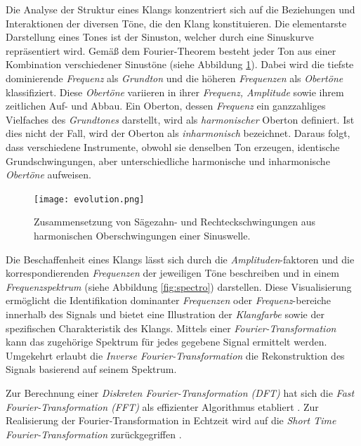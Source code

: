 \documentclass[
  a4paper,  %
  twoside,  %
  bibliography=totoc,
  headsepline,
  cleardoublepage=empty,
  parskip=half,
  draft=false
]{scrbook}
\begin{document}
Die Analyse der Struktur eines Klangs konzentriert sich auf die Beziehungen und Interaktionen der diversen Töne, die den Klang konstituieren. Die elementarste Darstellung eines Tones ist der Sinuston, welcher durch eine Sinuskurve repräsentiert wird. Gemäß dem Fourier-Theorem besteht jeder Ton aus einer Kombination verschiedener Sinustöne (siehe Abbildung \ref{fig:evolution}). Dabei wird die tiefste dominierende \emph{Frequenz} als \emph{Grundton} und die höheren \emph{Frequenzen} als \emph{Obertöne} klassifiziert. Diese \emph{Obertöne} variieren in ihrer \emph{Frequenz, Amplitude} sowie ihrem zeitlichen Auf- und Abbau. Ein Oberton, dessen \emph{Frequenz} ein ganzzahliges Vielfaches des \emph{Grundtones} darstellt, wird als \emph{harmonischer} Oberton definiert. Ist dies nicht der Fall, wird der Oberton als \emph{inharmonisch} bezeichnet. Daraus folgt, dass verschiedene Instrumente, obwohl sie denselben Ton erzeugen, identische Grundschwingungen, aber unterschiedliche harmonische und inharmonische \emph{Obertöne} aufweisen. \cite{parker_good_2009, white_physics_2014, ruschkowski_elektronische_2019}

\begin{figure}
  \centering
  \texttt{[image: evolution.png]}
  \caption[Fourier Reihe]{Zusammensetzung von Sägezahn- und Rechteckschwingungen aus harmonischen Oberschwingungen einer Sinuswelle.}
  \label{fig:evolution}
\end{figure}

Die Beschaffenheit eines Klangs lässt sich durch die \emph{Amplituden}-faktoren und die korrespondierenden \emph{Frequenzen} der jeweiligen Töne beschreiben und in einem \emph{Frequenzspektrum} (siehe Abbildung \ref{fig:spectro}) darstellen. Diese Visualisierung ermöglicht die Identifikation dominanter \emph{Frequenzen} oder \emph{Frequenz}-bereiche innerhalb des Signals und bietet eine Illustration der \emph{Klangfarbe} sowie der spezifischen Charakteristik des Klangs. Mittels einer \emph{Fourier-Transformation} kann das zugehörige Spektrum für jedes gegebene Signal ermittelt werden. Umgekehrt erlaubt die \emph{Inverse Fourier-Transformation} die Rekonstruktion des Signals basierend auf seinem Spektrum. \cite{raffaseder_audiodesign_2010}

Zur Berechnung einer \emph{Diskreten Fourier-Transformation (DFT)} hat sich die \emph{Fast Fourier-Transformation (FFT)} als effizienter Algorithmus etabliert \cite{heideman_gauss_1985}. Zur Realisierung der Fourier-Transformation in Echtzeit wird auf die \emph{Short Time Fourier-Transformation} zurückgegriffen \cite{thyagarajan_introduction_2019}. 
\end{document}
